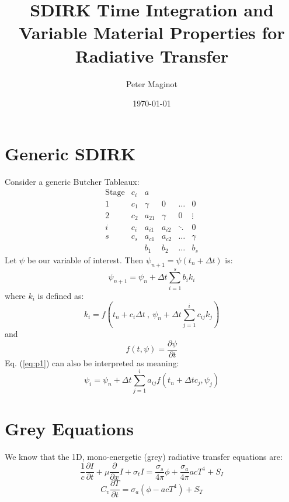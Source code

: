 \documentclass[11pt]{article}
\newcommand{\benum}{\begin{equation}}
\newcommand{\eenum}{\end{equation}}
\newcommand{\be}{\begin{equation*}}
\newcommand{\ee}{\end{equation*}}
\newcommand{\eqt}[1]{Eq. (\ref{#1})}
\newcommand{\p}{\ensuremath{ \partial}}
\begin{document}
\author{Peter Maginot}
\date{\today}
\title{SDIRK Time Integration and Variable Material Properties for Radiative Transfer}
\maketitle
\section{Generic SDIRK}
Consider a generic Butcher Tableaux:
\be
\begin{array}{c|c|cccc}
\text{Stage}& c_i 	 & a  			&  		&					&	\\
\hline
1						&  c_1   &  \gamma 	&  0  	&		\dots		&  0 \\
2						&  c_2   &  a_{21}  & \gamma  & 		0		& \vdots	\\	
i						& c_i    &   a_{i1} &  a_{i2} & \ddots   &	0	\\
s      			&  c_s   &   a_{c1} & a_{c2} 	& \dots 		& \gamma \\
\hline
{}					&				&		b_1		&		b_2			& \dots 	&   b_s
\end{array}
\ee
Let $\psi$ be our variable of interest.  Then $\psi_{n+1}=\psi(t_n + \Delta t)$ is:
\benum
\psi_{n+1} = \psi_n + \Delta t \sum_{i=1}^s{b_i k_i}
\label{eq:p1}
\eenum
where $k_i$ is defined as:
\be
k_i = f\left( t_n + c_i \Delta t ~,~\psi_{n} + \Delta t \sum_{j=1}^i{c_{ij} k_j }\right)
\ee
and
\be
f(t,\psi) = \frac{\p \psi}{\p t}
\ee
\eqt{eq:p1} can also be interpreted as meaning:
\benum
\psi_i = \psi_{n} + \Delta t \sum_{j=1}^i{a_{ij} f\left(t_n + \Delta t c_j , \psi_j\right)}
\label{eq:psi-def}
\eenum

\section{Grey Equations}
We know that the 1D, mono-energetic (grey) radiative transfer equations are:
\be
\frac{1}{c}\frac{\p I}{\p t} + \mu \frac{\p }{\p x}I + \sigma_{t} I = \frac{\sigma_{s}}{4\pi}\phi + \frac{\sigma_{a}}{4\pi} acT^4 + S_I
\ee
\be
C_v\frac{\p T}{\p t} = \sigma_a\left(\phi - acT^4\right) + S_T
\ee
\end{document}
